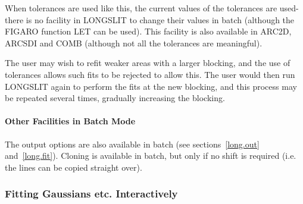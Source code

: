 When tolerances are used like this, the current values of the tolerances
are used-there is no facility in LONGSLIT to change their values in
batch (although the FIGARO function LET can be used). This facility is
also available in ARC2D, ARCSDI and COMB (although not all the
tolerances are meaningful).

The user may wish to refit weaker areas with a larger blocking, and the
use of tolerances allows such fits to be rejected to allow this.
The user would then run LONGSLIT again to perform the fits at the new
blocking, and this process may be repeated several times, gradually
increasing the blocking.

\paragraph{Other Facilities in Batch Mode}

The output options are also available in batch (see
sections~\ref{long.out} and~\ref{long.fit}).
Cloning is available in batch, but only if no shift is required (i.e.
the lines can be copied straight over).

\subsubsection{Fitting Gaussians etc. Interactively}

